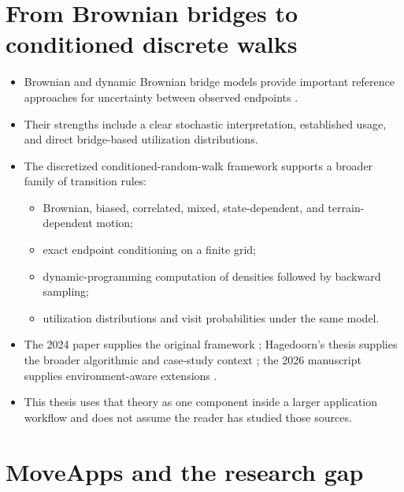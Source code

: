 \section{From Brownian bridges to conditioned discrete walks}

\begin{itemize}
  \item Brownian and dynamic Brownian bridge models provide important reference approaches for uncertainty between observed endpoints \parencite{horne2007bbmm,kranstauber2012dbbmm}.
  \item Their strengths include a clear stochastic interpretation, established usage, and direct bridge-based utilization distributions.
  \item The discretized conditioned-random-walk framework supports a broader family of transition rules:
  \begin{itemize}
    \item Brownian, biased, correlated, mixed, state-dependent, and terrain-dependent motion;
    \item exact endpoint conditioning on a finite grid;
    \item dynamic-programming computation of densities followed by backward sampling;
    \item utilization distributions and visit probabilities under the same model.
  \end{itemize}
  \item The 2024 paper supplies the original framework \parencite{buchin2024randomwalks}; Hagedoorn's thesis supplies the broader algorithmic and case-study context \parencite{hagedoornPhD}; the 2026 manuscript supplies environment-aware extensions \parencite{buchin2026advanced}.
  \item This thesis uses that theory as one component inside a larger application workflow and does not assume the reader has studied those sources.
\end{itemize}

\section{MoveApps and the research gap}


